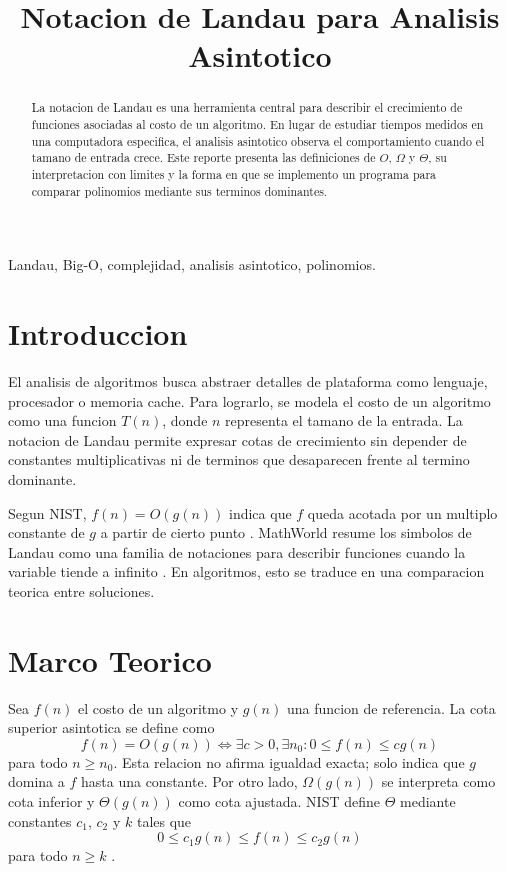 \documentclass[conference]{IEEEtran}
\title{Notacion de Landau para Analisis Asintotico}
\author{\IEEEauthorblockN{Ronquillo Nunez Braulio}
\IEEEauthorblockA{Analisis y Diseno de Algoritmos}}
\begin{document}
\maketitle

\begin{abstract}
La notacion de Landau es una herramienta central para describir el crecimiento
de funciones asociadas al costo de un algoritmo. En lugar de estudiar tiempos
medidos en una computadora especifica, el analisis asintotico observa el
comportamiento cuando el tamano de entrada crece. Este reporte presenta las
definiciones de $O$, $\Omega$ y $\Theta$, su interpretacion con limites y la
forma en que se implemento un programa para comparar polinomios mediante sus
terminos dominantes.
\end{abstract}

\begin{IEEEkeywords}
Landau, Big-O, complejidad, analisis asintotico, polinomios.
\end{IEEEkeywords}

\section{Introduccion}
El analisis de algoritmos busca abstraer detalles de plataforma como lenguaje,
procesador o memoria cache. Para lograrlo, se modela el costo de un algoritmo
como una funcion $T(n)$, donde $n$ representa el tamano de la entrada. La
notacion de Landau permite expresar cotas de crecimiento sin depender de
constantes multiplicativas ni de terminos que desaparecen frente al termino
dominante.

Segun NIST, $f(n)=O(g(n))$ indica que $f$ queda acotada por un multiplo
constante de $g$ a partir de cierto punto \cite{nist_big_o}. MathWorld resume
los simbolos de Landau como una familia de notaciones para describir funciones
cuando la variable tiende a infinito \cite{mathworld_landau}. En algoritmos,
esto se traduce en una comparacion teorica entre soluciones.

\section{Marco Teorico}
Sea $f(n)$ el costo de un algoritmo y $g(n)$ una funcion de referencia. La
cota superior asintotica se define como
\begin{equation}
f(n)=O(g(n)) \iff \exists c>0,\exists n_0:0\leq f(n)\leq c g(n)
\end{equation}
para todo $n\geq n_0$. Esta relacion no afirma igualdad exacta; solo indica
que $g$ domina a $f$ hasta una constante. Por otro lado, $\Omega(g(n))$ se
interpreta como cota inferior y $\Theta(g(n))$ como cota ajustada. NIST define
$\Theta$ mediante constantes $c_1$, $c_2$ y $k$ tales que
\begin{equation}
0\leq c_1g(n)\leq f(n)\leq c_2g(n)
\end{equation}
para todo $n\geq k$ \cite{nist_theta}.
\end{document}
